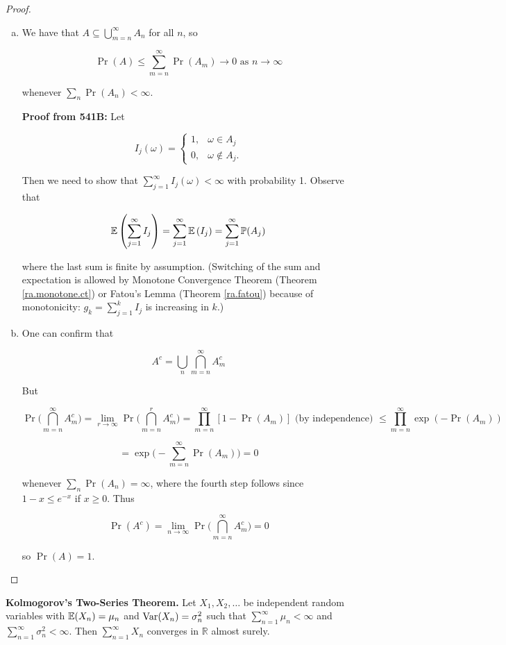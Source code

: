 \begin{proof}
\begin{enumerate}[(a)]

\item We have that \(A \subseteq \bigcup_{m=n}^\infty A_n\) for all \(n\), so

\[
\Pr(A) \leq \sum_{m=n}^\infty \Pr(A_m) \to 0 \text{ as } n \to \infty
\]

whenever \(\sum_n \Pr(A_n) < \infty\).

\textbf{Proof from 541B:} Let

\[
I_j(\omega) = \begin{cases}
1, & \omega \in A_j \\
0, & \omega \notin A_j.
\end{cases}
\]

Then we need to show that \(\sum_{j=1}^\infty I_j(\omega) < \infty\) with probability 1. Observe that 

\[
\mathbb{E} \left( \sum_{j =1}^\infty I_j \right) =\sum_{j =1}^\infty   \mathbb{E} \left(  I_j \right)  =\sum_{j =1}^\infty   \mathbb{P}(A_j)
\]

where the last sum is finite by assumption. (Switching of the sum and expectation is allowed by Monotone Convergence Theorem (Theorem \ref{ra.monotone.ct}) or Fatou's Lemma (Theorem \ref{ra.fatou}) because of monotonicity: \(g_k = \sum_{j=1}^k I_j\) is increasing in \(k\).)

\item One can confirm that 

\[
A^c = \bigcup_n \bigcap_{m=n}^\infty A_m^c
\]

But 

\[
\Pr \bigg( \bigcap_{m=n}^\infty A_m^c \bigg) = \lim_{r \to \infty}\Pr \bigg( \bigcap_{m=n}^r A_m^c \bigg) = \prod_{m=n}^\infty[ 1 - \Pr(A_m)] \text{ (by independence) } \leq  \prod_{m=n}^\infty \exp(- \Pr(A_m)) 
\]

\[
= \exp \bigg(- \sum_{m=n}^\infty \Pr(A_m) \bigg) = 0
\]

whenever \(\sum_n \Pr(A_n) = \infty\), where the fourth step follows since \(1 - x \leq e^{-x}\) if \(x \geq 0\). Thus

\[
\Pr(A^c) = \lim_{n \to \infty} \Pr \bigg( \bigcap_{m=n}^\infty A_m^c \bigg) = 0
\]

so \(\Pr(A) = 1\).

\end{enumerate}
\end{proof}

\begin{theorem}\label{asym:k2st}\textbf{Kolmogorov's Two-Series Theorem.} Let \(X_1, X_2, \ldots\) be independent random variables with \(\mathbb{E}(X_n) = \mu_n\) and \(\mathrm{Var}(X_n) = \sigma_n^2\) such that \(\sum_{n=1}^\infty \mu_n < \infty\) and \(\sum_{n=1}^\infty \sigma_n^2 < \infty\). Then \(\sum_{n=1}^\infty X_n\) converges in \(\mathbb{R}\) almost surely.
\end{theorem}

